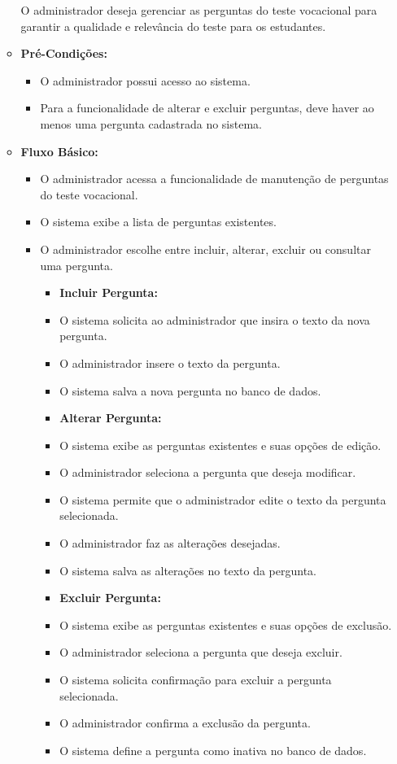 \begin{itemize}
\begin{itemize}
        O administrador deseja gerenciar as perguntas do teste vocacional para garantir a qualidade e relevância do teste para os estudantes.
        \item \textbf{Pré-Condições:}
        \begin{itemize}
            \item O administrador possui acesso ao sistema.
            \item Para a funcionalidade de alterar e excluir perguntas, deve haver ao menos uma pergunta cadastrada no sistema.
        \end{itemize}
        \item \textbf{Fluxo Básico:}
        \begin{itemize}
            \item O administrador acessa a funcionalidade de manutenção de perguntas do teste vocacional.
            \item O sistema exibe a lista de perguntas existentes.
            \item O administrador escolhe entre incluir, alterar, excluir ou consultar uma pergunta.
            \begin{itemize}
                \item \textbf{Incluir Pergunta:}                
                \item O sistema solicita ao administrador que insira o texto da nova pergunta.
                \item O administrador insere o texto da pergunta.
                \item O sistema salva a nova pergunta no banco de dados.
                
                \item \textbf{Alterar Pergunta:}
                \item O sistema exibe as perguntas existentes e suas opções de edição.
                \item O administrador seleciona a pergunta que deseja modificar.
                \item O sistema permite que o administrador edite o texto da pergunta selecionada.
                \item O administrador faz as alterações desejadas.
                \item O sistema salva as alterações no texto da pergunta.
                
                \item \textbf{Excluir Pergunta:}
                \item O sistema exibe as perguntas existentes e suas opções de exclusão.
                \item O administrador seleciona a pergunta que deseja excluir.
                \item O sistema solicita confirmação para excluir a pergunta selecionada.
                \item O administrador confirma a exclusão da pergunta.
                \item O sistema define a pergunta como inativa no banco de dados.
                

\end{itemize}
\end{itemize}
\end{itemize}
\end{itemize}
